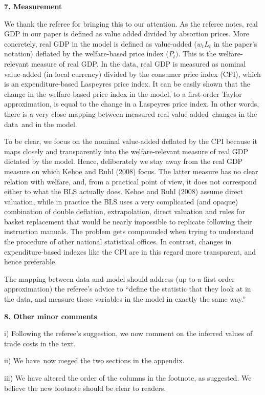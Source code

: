 \documentclass[12pt]{article}
\begin{document}
\textbf{7. Measurement}

We thank the referee for bringing this to our attention. As the referee
notes, real GDP in our paper is defined as value added divided by absortion
prices. More concretely, real GDP in the model is defined as value-added ($%
w_{t}L_{t}$ in the paper's notation) deflated by the welfare-based price
index ($P_{t})$. This is the welfare-relevant measure of real GDP. In the
data, real GDP is measured as nominal value-added (in local currency)
divided by the consumer price index (CPI), which is an expenditure-based
Laspeyres price index. It can be easily shown that the change in the
welfare-based price index in the model, to a first-order Taylor
approximation, is equal to the change in a Laspeyres price index. In other
words, there is a very close mapping between measured real value-added\
changes in the data\ and in the model.

To be clear, we focus on the nominal value-added deflated by the CPI because
it maps closely and transparently into the welfare-relevant measure of real
GDP dictated by the model. Hence, deliberately we stay away from the real
GDP measure on which Kehoe and Ruhl (2008) focus. The latter measure has no
clear relation with welfare, and, from a practical point of view, it does
not correspond either to what the BLS actually does. Kehoe and Ruhl (2008)
assume direct valuation, while in practice the BLS uses a very complicated
(and opaque) combination of double deflation, extrapolation, direct
valuation and rules for basket replacement that would be nearly impossible
to replicate following their instruction manuals. The problem gets
compounded when trying to understand the procedure of other national
statistical offices. In contrast, changes in expenditure-based indexes like
the CPI are in this regard more transparent, and hence preferable.

The mapping between data and model should address (up to a first order
approximation) the referee's advice to \textquotedblleft define the
statistic that they look at in the data, and measure these variables in the
model in exactly the same way.\textquotedblright\ \bigskip 

\textbf{8. Other minor comments}

i) Following the referee's suggestion, we now comment on the inferred values
of trade costs in the text.

ii) We have\ now meged the two sections in the appendix.

iii) We have altered the order of the columns in the footnote, as suggested.
We believe the new footnote should be clear to readers.\bigskip
\end{document}
